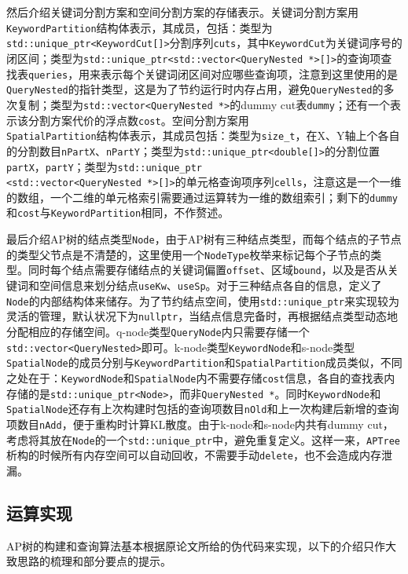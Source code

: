 \documentclass[UTF8]{ctexart}
\begin{document}
然后介绍关键词分割方案和空间分割方案的存储表示。关键词分割方案用\texttt{KeywordPartition}结构体表示，其成员，包括：类型为\texttt{std::unique\_ptr<KeywordCut[]>}分割序列\texttt{cuts}，其中\texttt{KeywordCut}为关键词序号的闭区间；类型为\texttt{std::unique\_ptr<std::vector<QueryNested *>[]>}的查询项查找表\texttt{queries}，用来表示每个关键词闭区间对应哪些查询项，注意到这里使用的是\texttt{QueryNested}的指针类型，这是为了节约运行时内存占用，避免\texttt{QueryNested}的多次复制；类型为\texttt{std::vector<QueryNested *>}的dummy cut表\texttt{dummy}；还有一个表示该分割方案代价的浮点数\texttt{cost}。空间分割方案用\\\texttt{SpatialPartition}结构体表示，其成员包括：类型为\texttt{size\_t}，在X、Y轴上个各自的分割数目\texttt{nPartX}、\texttt{nPartY}；类型为\texttt{std::unique\_ptr<double[]>}的分割位置\texttt{partX}，\texttt{partY}；类型为\texttt{std::unique\_ptr\\<std::vector<QueryNested *>[]>}的单元格查询项序列\texttt{cells}，注意这是一个一维的数组，一个二维的单元格索引需要通过运算转为一维的数组索引；剩下的\texttt{dummy}和\texttt{cost}与\texttt{KeywordPartition}相同，不作赘述。

最后介绍AP树的结点类型\texttt{Node}，由于AP树有三种结点类型，而每个结点的子节点的类型父节点是不清楚的，这里使用一个\texttt{NodeType}枚举来标记每个子节点的类型。同时每个结点需要存储结点的关键词偏置\texttt{offset}、区域\texttt{bound}，以及是否从关键词和空间信息来划分结点\texttt{useKw}、\texttt{useSp}。对于三种结点各自的信息，定义了\texttt{Node}的内部结构体来储存。为了节约结点空间，使用\texttt{std::unique\_ptr}来实现较为灵活的管理，默认状况下为\texttt{nullptr}，当结点信息完备时，再根据结点类型动态地分配相应的存储空间。q-node类型\texttt{QueryNode}内只需要存储一个\texttt{std::vector<QueryNested>}即可。k-node类型\texttt{KeywordNode}和s-node类型\texttt{SpatialNode}的成员分别与\texttt{KeywordPartition}和\texttt{SpatialPartition}成员类似，不同之处在于：\texttt{KeywordNode}和\texttt{SpatialNode}内不需要存储\texttt{cost}信息，各自的查找表内存储的是\texttt{std::unique\_ptr<Node>}，而非\texttt{QueryNested *}。同时\texttt{KeywordNode}和\texttt{SpatialNode}还存有上次构建时包括的查询项数目\texttt{nOld}和上一次构建后新增的查询项数目\texttt{nAdd}，便于重构时计算KL散度。由于k-node和s-node内共有dummy cut，考虑将其放在\texttt{Node}的一个\texttt{std::unique\_ptr}中，避免重复定义。这样一来，\texttt{APTree}析构的时候所有内存空间可以自动回收，不需要手动\texttt{delete}，也不会造成内存泄漏。

\subsection{运算实现}
AP树的构建和查询算法基本根据原论文所给的伪代码来实现，以下的介绍只作大致思路的梳理和部分要点的提示。
\end{document}
